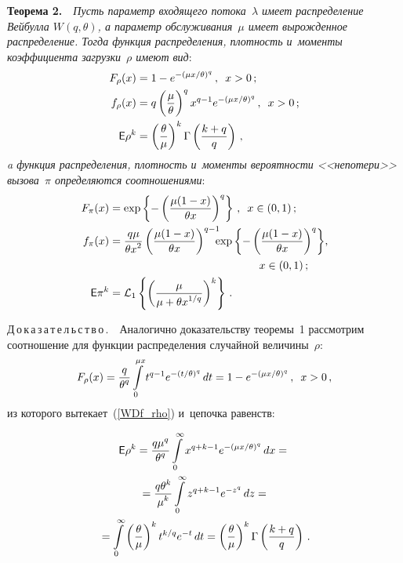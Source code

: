 \begin{multicols}{2}
\noindent
\textbf{Теорема 2.}\ \
\textit{Пусть параметр входящего потока~$\lambda$ имеет распределение 
Вейбулла $W(q,\theta)$, а параметр обслуживания~$\mu$ имеет вырожденное распределение. 
Тогда функция распределения, плотность и~моменты коэффициента загрузки~$\rho$ 
имеют вид}:
\begin{align}
F_\rho(x)&=1 - e^{-(\mu x/\theta)^{q}}\,, \enskip x>0\,;\notag
\\
f_\rho(x)&=q\left(\displaystyle\frac{\displaystyle \mu\mathstrut}{\displaystyle \theta\mathstrut}\right)^q x^{q-1}e^{-(\mu x/\theta)^q}\,, \enskip x>0\,;
\label{WDf_rho}
\\
{\sf E}\rho^k &= \left(\displaystyle\frac{\displaystyle \theta\mathstrut}{\displaystyle \mu\mathstrut}\right)^{k}\Gamma\left(\displaystyle\frac{\displaystyle k+q\mathstrut}{\displaystyle q\mathstrut}\right)\,,\notag
\end{align}
\textit{a функция распределения, плотность и~моменты вероятности <<непотери>> 
вызова~$\pi$ определяются соотношениями}:
\begin{align}
F_\pi(x) &=\exp\left\lbrace -\left(\fr{\mu(1-x)}{\theta x}\right)^q\right\rbrace \,,\enskip
x\in(0,1)\,;\notag
\\
\hspace*{-3pt}f_\pi(x) &= \fr{q\mu}{\theta x^2}\left(\fr{\mu(1-x)}{\theta x}\right)^{q-1}\hspace*{-6pt}
\exp{\left\lbrace-\left(\fr{\mu(1-x)}{\theta x}\right)^q\right\rbrace},\notag \\ 
&\hspace*{48mm}x\in(0,1)\,;\label{WDf_pi}
\\
{\sf E}\pi^k &= \mathcal{L}_1\left\lbrace\left(
\fr{\mu}{\mu+\theta x^{1/q}}\right)^k\right\rbrace\,.\notag
\end{align}


\noindent
Д\,о\,к\,а\,з\,а\,т\,е\,л\,ь\,с\,т\,в\,о\,.\ \
Аналогично доказательству теоремы~1 рассмотрим соотношение для 
функции распределения случайной величины~$\rho$:
$$
F_\rho(x) =\displaystyle\frac{\displaystyle q\mathstrut}{\displaystyle \theta^q\mathstrut}\int\limits_0^{\mu x}t^{q-1}e^{-(t/\theta)^{q}}\,dt 
= 1 - e^{-(\mu x/\theta)^{q}}\,, \enskip x>0\,,
$$
из которого вытекает~(\ref{WDf_rho}) и~цепочка равенств:

\vspace*{-2pt}

\noindent
\begin{multline*}
{\sf E}\rho^{k}=\displaystyle\frac{\displaystyle q\mu^q\mathstrut}{\displaystyle \theta^q\mathstrut}\int\limits_0^{\infty} 
x^{q + k -1}e^{-(\mu x/\theta)^q}\,dx={}\\
{}=
\displaystyle\frac{\displaystyle q\theta^k\mathstrut}{\displaystyle \mu^k\mathstrut}\int\limits_0^{\infty}z^{q+k-1}e^{-z^{q}}\,dz={}\\
{}= \int\limits_0^{\infty}\left(\displaystyle\frac{\displaystyle \theta\mathstrut}{\displaystyle \mu\mathstrut}\right)^{k}t^{{k/q}}e^{-t}\,dt = 
\left(\displaystyle\frac{\displaystyle \theta\mathstrut}{\displaystyle \mu\mathstrut}\right)^{k}\Gamma\left(\displaystyle\frac{\displaystyle k+q\mathstrut}{\displaystyle q\mathstrut}\right)\,.
\end{multline*}

\end{multicols}

